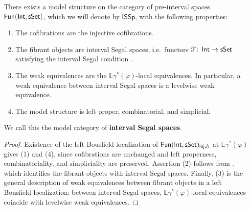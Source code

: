 \begin{proposition}\label{ch2:: prop: model structure interval Segal space}
    There exists a model structure on the category of pre-interval spaces
    $\operatorname{\sf Fun}(\operatorname{\mathsf{Int}},\operatorname{\sf sSet})$, which we will denote by $\mathsf{ISSp}$, with the
    following properties:
    \begin{enumerate}
        \item The cofibrations are the injective cofibrations.
        \item The fibrant objects are interval Segal spaces, i.e.\ functors
              $\mathcal F\colon \operatorname{\mathsf{Int}} \to \operatorname{\sf sSet}$ satisfying the interval Segal condition .
        \item The weak equivalences are the $\mathbb{L}\gamma^{*}(\varphi)$-local
              equivalences. In particular, a weak equivalence between interval
              Segal spaces is a levelwise weak equivalence.
        \item The model structure is left proper, combinatorial, and simplicial.
    \end{enumerate}
    We call this the model category of \textbf{interval Segal spaces}. 
\end{proposition}

\begin{proof}
    Existence of the left Bousfield localization of
    $\operatorname{{\sf Fun}}(\operatorname{\mathsf{Int}},\operatorname{\sf sSet})_{\mathsf{inj},h}$ at $\mathbb{L}\gamma^{*}(\varphi)$ gives
    (1) and (4), since cofibrations are unchanged and left properness,
    combinatoriality, and simpliciality are preserved. Assertion (2) follows
    from , which identifies the
    fibrant objects with interval Segal spaces. Finally, (3) is the general
    description of weak equivalences between fibrant objects in a left
    Bousfield localization: between interval Segal spaces,
    $\mathbb{L}\gamma^{*}(\varphi)$-local equivalences coincide with levelwise
    weak equivalences.
\end{proof}


